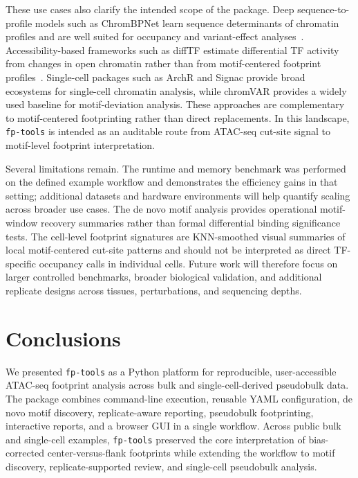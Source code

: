 \documentclass[biomedinformatics,article,submit,pdftex,moreauthors]{Definitions/mdpi}
\begin{document}
These use cases also clarify the intended scope of the package. Deep
sequence-to-profile models such as ChromBPNet learn sequence determinants of
chromatin profiles and are well suited for occupancy and variant-effect
analyses~\cite{chrombpnet2024}. Accessibility-based frameworks such as diffTF
estimate differential TF activity from changes in open chromatin rather than
from motif-centered footprint profiles~\cite{Berest2019_diffTF}. Single-cell
packages such as ArchR and Signac provide broad ecosystems for single-cell
chromatin analysis, while chromVAR provides a widely used baseline for
motif-deviation analysis. These approaches are complementary to motif-centered
footprinting rather than direct replacements. In this landscape,
\texttt{fp-tools} is intended as an auditable route from ATAC-seq cut-site signal
to motif-level footprint interpretation.

Several limitations remain. The runtime and memory benchmark was performed on
the defined example workflow and demonstrates the efficiency gains in that
setting; additional datasets and hardware environments will help quantify
scaling across broader use cases. The de novo motif analysis provides
operational motif-window recovery summaries rather than formal differential
binding significance tests. The cell-level footprint signatures are KNN-smoothed
visual summaries of local motif-centered cut-site patterns and should not be
interpreted as direct TF-specific occupancy calls in individual cells. Future
work will therefore focus on larger controlled benchmarks, broader biological
validation, and additional replicate designs across tissues, perturbations, and
sequencing depths.

\section{Conclusions}

We presented \texttt{fp-tools} as a Python platform for reproducible,
user-accessible ATAC-seq footprint analysis across bulk and single-cell-derived
pseudobulk data. The package combines command-line execution, reusable YAML
configuration, de novo motif discovery, replicate-aware reporting, pseudobulk
footprinting, interactive reports, and a browser GUI in a single workflow.
Across public bulk and single-cell examples, \texttt{fp-tools} preserved the
core interpretation of bias-corrected center-versus-flank footprints while
extending the workflow to motif discovery, replicate-supported review, and
single-cell pseudobulk analysis.
\end{document}
